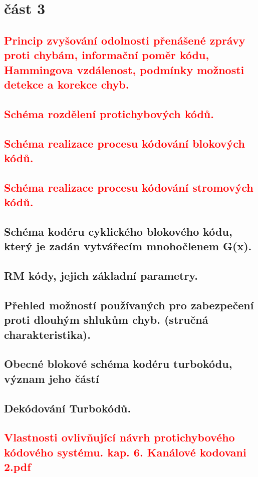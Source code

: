 \section{část 3}
\subsection{\textcolor{red}{Princip zvyšování odolnosti přenášené zprávy proti chybám, informační poměr kódu, Hammingova vzdálenost, podmínky možnosti detekce a korekce chyb.}}
\subsection{\textcolor{red}{Schéma rozdělení protichybových kódů.}}
\subsection{\textcolor{red}{Schéma realizace procesu kódování blokových kódů.}}
\subsection{\textcolor{red}{Schéma realizace procesu kódování stromových kódů.}}
\subsection{Schéma kodéru cyklického blokového kódu, který je zadán vytvářecím mnohočlenem G(x).}
\subsection{RM kódy, jejich základní parametry.}
\subsection{Přehled možností používaných pro zabezpečení proti dlouhým shlukům chyb. (stručná charakteristika).}
\subsection{Obecné blokové schéma kodéru turbokódu, význam jeho částí}
\subsection{Dekódování Turbokódů.}
\subsection{\textcolor{red}{Vlastnosti ovlivňující návrh protichybového kódového systému. kap. 6. Kanálové kodovani 2.pdf}}
